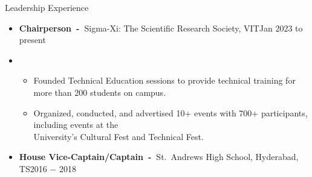 \documentclass{resume}
\begin{document}
\vspace{-0.5\baselineskip}


\begin{rSection}{Leadership Experience}
      \begin{itemize}[label=\null, leftmargin=*, parsep=0.5em]
            \item {
                  \textbf{Chairperson~-~}Sigma-Xi: The Scientific Research Society, VIT\hfill Jan 2023 to present
                  } \\
            \item {
                  \vspace{-1.2\baselineskip}
                  \begin{itemize}[label=$\bullet$]
                        \vspace{-\parskip}
                        \vspace{-\parsep}
                        \item {
                              Founded Technical Education sessions to provide technical training for more than 200 students on campus.
                              }
                        \item {
                              Organized, conducted, and advertised 10+ events with 700+ participants, including events at the \\
                              University's Cultural Fest and Technical Fest.
                              }
                  \end{itemize}
                  }



            \item {
                  \textbf{House Vice-Captain/Captain~-~}St.~Andrews High School, Hyderabad, TS\hfill 2016 $-$ 2018
                  }
      \end{itemize}


\end{rSection}


\vspace{-0.5\baselineskip}
\end{document}

